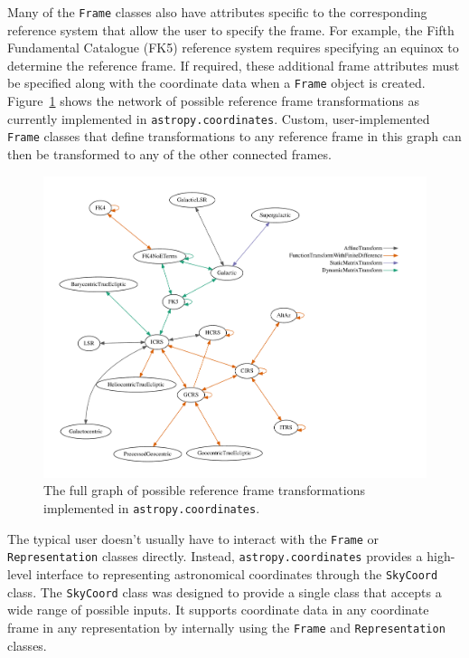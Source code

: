 \documentclass[modern]{aastex61}
\renewcommand{\figurename}{Figure\xspace}
\begin{document}
Many of the \texttt{Frame} classes also have attributes specific to the
corresponding reference system that allow the user to specify the frame.
For example, the Fifth Fundamental Catalogue (FK5) reference system requires
specifying an equinox to determine the reference frame.
If required, these additional frame attributes must be specified along with the
coordinate data when a \texttt{Frame} object is created.
\figurename~\ref{fig:frame-transform-graph} shows the network of possible
reference frame transformations as currently implemented in
\texttt{astropy.coordinates}.
Custom, user-implemented \texttt{Frame} classes that define transformations to
any reference frame in this graph can then be transformed to any of the other
connected frames.

\begin{figure}
\includegraphics[width=\textwidth]{coordinates_graph.pdf}
The full graph of possible reference frame transformations implemented in
\texttt{astropy.coordinates}.
\label{fig:frame-transform-graph}
\end{figure}

The typical user doesn't usually have to interact with the \texttt{Frame} or
\texttt{Representation} classes directly.
Instead, \texttt{astropy.coordinates} provides a high-level interface to
representing astronomical coordinates through the \texttt{SkyCoord} class.
The \texttt{SkyCoord} class was designed to provide a single class that
accepts a wide range of possible inputs.
It supports coordinate data in any coordinate frame in any representation by
internally using the \texttt{Frame} and \texttt{Representation} classes.
\end{document}
